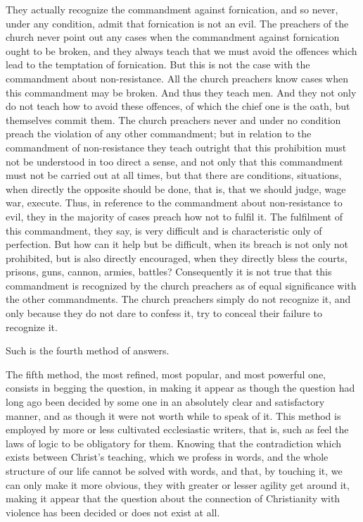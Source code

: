 \documentclass{book}
\begin{document}
They actually recognize the commandment against fornication, and so never, under any condition, admit that fornication is not an evil. The preachers of the church never point out any cases when the commandment against fornication ought to be broken, and they always teach that we must avoid the offences which lead to the temptation of fornication. But this is not the case with the commandment about non-resistance. All the church preachers know cases when this commandment may be broken. And thus they teach men. And they not only do not teach how to avoid these offences, of which the chief one is the oath, but themselves commit them. The church preachers never and under no condition preach the violation of any other commandment; but in relation to the commandment of non-resistance they teach outright that this prohibition must not be understood in too direct a sense, and not only that this commandment must not be carried out at all times, but that there are conditions, situations, when directly the opposite should be done, that is, that we should judge, wage war, execute. Thus, in reference to the commandment about non-resistance to evil, they in the majority of cases preach how not to fulfil it. The fulfilment of this commandment, they say, is very difficult and is characteristic only of perfection. But how can it help but be difficult, when its breach is not only not prohibited, but is also directly encouraged, when they directly bless the courts, prisons, guns, cannon, armies, battles? Consequently it is not true that this commandment is recognized by the church preachers as of equal significance with the other commandments. The church preachers simply do not recognize it, and only because they do not dare to confess it, try to conceal their failure to recognize it.

Such is the fourth method of answers.

The fifth method, the most refined, most popular, and most powerful one, consists in begging the question, in making it appear as though the question had long ago been decided by some one in an absolutely clear and satisfactory manner, and as though it were not worth while to speak of it. This method is employed by more or less cultivated ecclesiastic writers, that is, such as feel the laws of logic to be obligatory for them. Knowing that the contradiction which exists between Christ’s teaching, which we profess in words, and the whole structure of our life cannot be solved with words, and that, by touching it, we can only make it more obvious, they with greater or lesser agility get around it, making it appear that the question about the connection of Christianity with violence has been decided or does not exist at all.\footnotemark[1]
\end{document}
